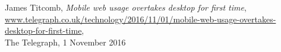 
\cleardoublepage{}

\begin{thebibliography}{9}
   
      James Titcomb,
      \textit{Mobile web usage overtakes desktop for first time},\\
      \href{www.telegraph.co.uk/technology/2016/11/01/mobile-web-usage-overtakes-desktop-for-first-time}{www.telegraph.co.uk/technology/2016/11/01/mobile-web-usage-overtakes-desktop-for-first-time},\\
      The Telegraph,
      1 November 2016
   
   \end{thebibliography}